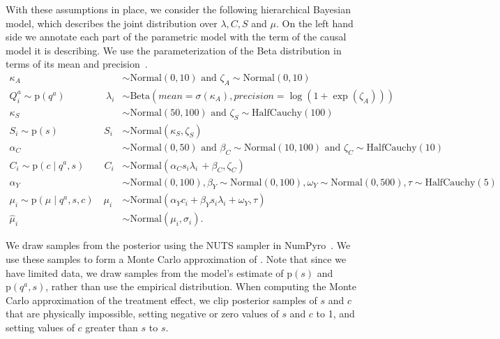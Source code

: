 \documentclass[12pt]{article}
\newcommand{\pr}{\mathrm{p}}
\begin{document}
With these assumptions in place, we consider the following hierarchical Bayesian model, which describes the joint distribution over $\lambda, C, S$ and $\mu$. On the left hand side we annotate each part of the parametric model with the term of the causal model it is describing. We use the parameterization of the Beta distribution in terms of its mean and precision~\citep{Ferrari2004-ag}.
\begin{equation*}
\begin{split}
        \kappa_{A} &\sim \mathrm{Normal}(0, 10) \text{ and } \zeta_{A} \sim \mathrm{Normal}(0, 10)\\
        Q^a_i \sim \pr(q^a)\,\quad\quad\quad \quad \lambda_i &\sim \mathrm{Beta}(mean = \sigma(\kappa_A), precision = \log(1 + \exp(\zeta_A)))\\
        \kappa_S &\sim \mathrm{Normal}(50, 100) \text{ and } \zeta_S \sim \mathrm{HalfCauchy}(100)\\
        S_i \sim \pr(s)\,\,\,\,\quad\quad\quad \quad S_i &\sim \mathrm{Normal}(\kappa_S, \zeta_S)\\
        \alpha_C &\sim \mathrm{Normal}(0, 50) \text{ and } \beta_C \sim \mathrm{Normal}(10, 100) \text{ and } \zeta_C \sim \mathrm{HalfCauchy}(10)\\
        C_i \sim \pr(c \mid q^a, s)\quad \quad C_i &\sim \mathrm{Normal}( \alpha_C s_i \lambda_i\,+\beta_C, \zeta_C)\\
        \alpha_Y &\sim \mathrm{Normal}(0, 100), \beta_Y \sim \mathrm{Normal}(0, 100), \omega_Y \sim \mathrm{Normal}(0, 500), \tau \sim \mathrm{HalfCauchy}(5)\\
        \mu_i \sim \pr(\mu \mid q^a, s, c) \quad \mu_i &\sim \mathrm{Normal}(\alpha_Y c_i + \beta_Y s_i \lambda_i + \omega_Y, \tau)\\
        \hat{\mu}_i &\sim \mathrm{Normal}(\mu_i, \sigma_i).
\end{split}
\end{equation*}

We draw samples from the posterior using the NUTS sampler in NumPyro~\citep{Hoffman2014-ic,Phan2019-om,Bingham2019-aa}.
We use these samples to form a Monte Carlo approximation of .
Note that since we have limited data, we draw samples from the model's estimate of $\pr(s)$ and $\pr(q^a, s)$, rather than use the empirical distribution.
When computing the Monte Carlo approximation of the treatment effect, we clip posterior samples of $s$ and $c$ that are physically impossible, setting negative or zero values of $s$ and $c$ to 1, and setting values of $c$ greater than $s$ to $s$. 
\end{document}
